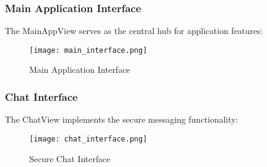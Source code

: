 \documentclass[12pt,a4paper]{article}
\begin{document}
\subsubsection{Main Application Interface}

The MainAppView serves as the central hub for application features:

\begin{figure}[H]
    \centering
    \texttt{[image: main\_interface.png]}
    \caption{Main Application Interface}
    \label{fig:main}
\end{figure}

\subsubsection{Chat Interface}

The ChatView implements the secure messaging functionality:

\begin{figure}[H]
    \centering
    \texttt{[image: chat\_interface.png]}
    \caption{Secure Chat Interface}
    \label{fig:chat}
\end{figure}
\end{document}
